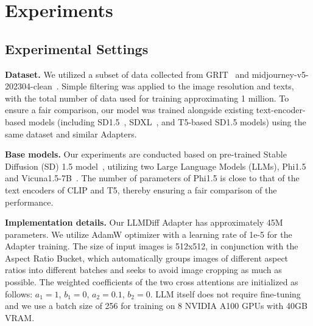 \section{Experiments}

\subsection{Experimental Settings}
\noindent
\textbf{Dataset.}
We utilized a subset of data collected from GRIT~\cite{GRIT} and midjourney-v5-202304-clean~\cite{mjv5-data}. Simple filtering was applied to the image resolution and texts,  with the total number of data used for training approximating 1 million. To ensure a fair comparison, our model was trained alongside existing text-encoder-based models (including SD1.5~\cite{LDM}, SDXL~\cite{SDXL}, and T5-based SD1.5 models) using the same dataset and similar Adapters.

\noindent
\textbf{Base models.}
Our experiments are conducted based on pre-trained Stable Diffusion (SD) 1.5 model~\cite{LDM}, utilizing two Large Language Models (LLMs), Phi1.5~\cite{phi1.5} and Vicuna1.5-7B~\cite{vicuna2023}. The number of parameters of Phi1.5 is close to that of the text encoders of CLIP and T5, thereby ensuring a fair comparison of the performance.

\noindent
\textbf{Implementation details.}
Our LLMDiff Adapter has approximately 45M parameters. We utilize AdamW optimizer with a learning rate of 1e-5 for the Adapter training. The size of input images is 512x512, in conjunction with the Aspect Ratio Bucket, which automatically groups images of different aspect ratios into different batches and seeks to avoid image cropping as much as possible. The weighted coefficients of the two cross attentions are initialized as follows: $a_1=1$, $b_1=0$, $a_2=0.1$, $b_2=0$. LLM itself does not require fine-tuning  %
and we use a batch size of 256 for training on 8 NVIDIA A100 GPUs with 40GB VRAM.

